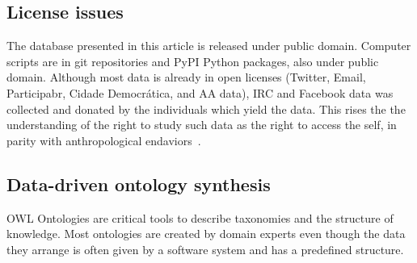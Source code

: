 \begin{enumerate}[leftmargin=0cm]
	\end{enumerate}

	\subsection{License issues}
	The database presented in this article is released under public domain.
	Computer scripts are in git repositories and PyPI Python packages, also under public domain.
	Although most data is already in open licenses (Twitter, Email, Participabr, Cidade Democrática, and AA data), IRC and Facebook data was collected
	and donated by the individuals which yield the data.
	This rises the the understanding of the right to study such data as the right to access the self,
	in parity with anthropological endaviors~\cite{antphy,antphy2}.


\subsection{Data-driven ontology synthesis}
OWL Ontologies are critical tools to describe taxonomies and the
structure of knowledge.
Most ontologies are created by domain experts even though the data they
arrange is often given by a software system and has a predefined
structure.  


